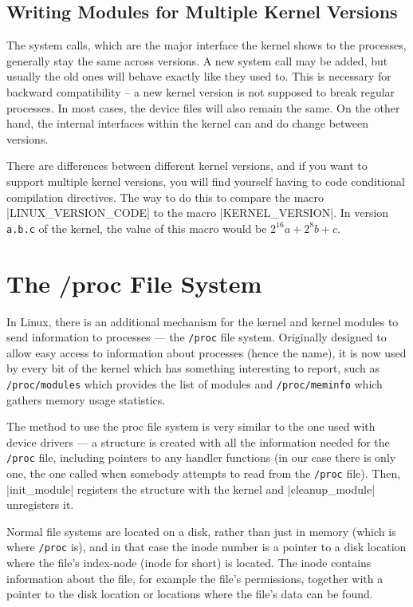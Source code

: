 \documentclass[10pt, oneside]{book}
\begin{document}

\subsection{Writing Modules for Multiple Kernel Versions}
\label{sec:modules_for_versions}
The system calls, which are the major interface the kernel shows to the processes, generally stay the same across versions.
A new system call may be added, but usually the old ones will behave exactly like they used to.
This is necessary for backward compatibility -- a new kernel version is not supposed to break regular processes.
In most cases, the device files will also remain the same. On the other hand, the internal interfaces within the kernel can and do change between versions.

There are differences between different kernel versions, and if you want to support multiple kernel versions, you will find yourself having to code conditional compilation directives.
The way to do this to compare the macro \cpp|LINUX_VERSION_CODE| to the macro \cpp|KERNEL_VERSION|.
In version \verb|a.b.c| of the kernel, the value of this macro would be \(2^{16}a+2^{8}b+c\).

\section{The /proc File System}
\label{sec:procfs}
In Linux, there is an additional mechanism for the kernel and kernel modules to send information to processes --- the \verb|/proc| file system.
Originally designed to allow easy access to information about processes (hence the name), it is now used by every bit of the kernel which has something interesting to report, such as \verb|/proc/modules| which provides the list of modules and \verb|/proc/meminfo| which gathers memory usage statistics.

The method to use the proc file system is very similar to the one used with device drivers --- a structure is created with all the information needed for the \verb|/proc| file, including pointers to any handler functions (in our case there is only one, the one called when somebody attempts to read from the \verb|/proc| file).
Then, \cpp|init_module| registers the structure with the kernel and \cpp|cleanup_module| unregisters it.

Normal file systems are located on a disk, rather than just in memory (which is where \verb|/proc| is), and in that case the inode number is a pointer to a disk location where the file's index-node (inode for short) is located.
The inode contains information about the file, for example the file's permissions, together with a pointer to the disk location or locations where the file's data can be found.
\end{document}
